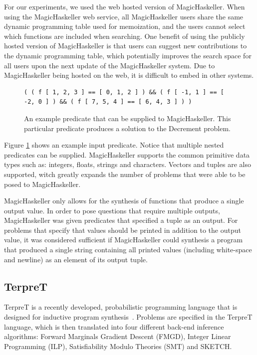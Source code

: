 For our experiments, we used the web hosted version of MagicHaskeller. When using the MagicHaskeller web service, all MagicHaskeller users share the same dynamic programming table used for memoization, and the users cannot select which functions are included when searching. One benefit of using the publicly hosted version of MagicHaskeller is that users can suggest new contributions to the dynamic programming table, which potentially improves the search space for all users upon the next update of the MagicHaskeller system. Due to MagicHaskeller being hosted on the web, it is difficult to embed in other systems.

\begin{figure}
\begin{verbatim}
( ( f [ 1, 2, 3 ] == [ 0, 1, 2 ] ) && ( f [ -1, 1 ] == [ -2, 0 ] ) && ( f [ 7, 5, 4 ] == [ 6, 4, 3 ] ) )   
\end{verbatim}
\caption{An example predicate that can be supplied to MagicHaskeller. This particular predicate produces a solution to the Decrement problem.}
\label{fig:MHpred}
\end{figure}

Figure \ref{fig:MHpred} shows an example input predicate. Notice that multiple nested predicates can be supplied. MagicHaskeller supports the common primitive data types such as: integers, floats, strings and characters. Vectors and tuples are also supported, witch greatly expands the number of problems that were able to be posed to MagicHaskeller.

MagicHaskeller only allows for the synthesis of functions that produce a single output value. In order to pose questions that require multiple outputs, MagicHaskeller was given predicates that specified a tuple as an output. For problems that specify that values should be printed in addition to the output value, it was considered sufficient if MagicHaskeller could synthesis a program that produced a single string containing all printed values (including white-space and newline) as an element of its output tuple.

\subsection{TerpreT}

TerpreT is a recently developed, probabilistic programming language that is designed for inductive program synthesis~\cite{Gaunt2016}. Problems are specified in the TerpreT language, which is then translated into four different back-end inference algorithms: Forward Marginals Gradient Descent (FMGD), Integer Linear Programming (ILP), Satisfiability Modulo Theories (SMT) and SKETCH.

